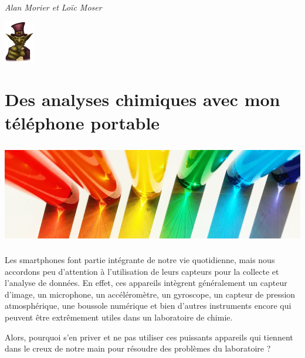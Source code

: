 \documentclass[
  10pt,
  french,
  a5paper,
  openany]{book}
\newenvironment{signature}{\begin{flushright}}{\end{flushright}}
\begin{document}
\begin{signature}
\emph{Alan Morier et Loïc Moser}

\end{signature}

\begin{flushright}
\includegraphics[width=\textwidth,height=5em]{images/le-jeu-video-fiction-ou-realite-2.jpg}

\end{flushright}

\hypertarget{des-analyses-chimiques-avec-mon-tuxe9luxe9phone-portable}{%
\chapter{\texorpdfstring{Des analyses chimiques \linebreak avec mon téléphone portable}{Des analyses chimiques avec mon téléphone portable}}\label{des-analyses-chimiques-avec-mon-tuxe9luxe9phone-portable}}

\begin{center}
\includegraphics[width=\textwidth,height=12em]{images/analyses-chimiques-telephone-portable.jpg}

\end{center}

Les smartphones font partie intégrante de notre vie quotidienne, mais nous accordons peu d'attention à l'utilisation de leurs capteurs pour la collecte et l'analyse de données. En effet, ces appareils intègrent généralement un capteur d'image, un microphone, un accéléromètre, un gyroscope, un capteur de pression atmosphérique, une boussole numérique et bien d'autres instruments encore qui peuvent être extrêmement utiles dans un laboratoire de chimie.

Alors, pourquoi s'en priver et ne pas utiliser ces puissants appareils qui tiennent dans le creux de notre main pour résoudre des problèmes du laboratoire ?
\end{document}
